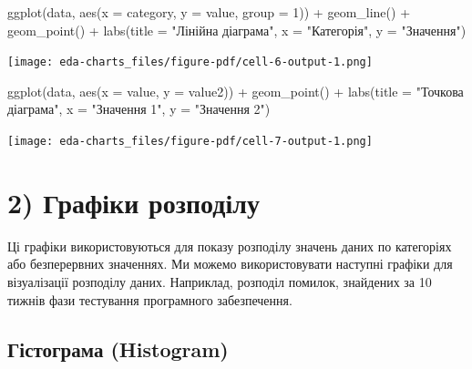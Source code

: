 \documentclass[
  letterpaper,
  DIV=11,
  numbers=noendperiod]{scrreprt}
\newenvironment{Shaded}{\begin{snugshade}}{\end{snugshade}}
\newcommand{\AttributeTok}[1]{\textcolor[rgb]{0.40,0.45,0.13}{#1}}
\newcommand{\DecValTok}[1]{\textcolor[rgb]{0.68,0.00,0.00}{#1}}
\newcommand{\FunctionTok}[1]{\textcolor[rgb]{0.28,0.35,0.67}{#1}}
\newcommand{\NormalTok}[1]{\textcolor[rgb]{0.00,0.23,0.31}{#1}}
\newcommand{\SpecialCharTok}[1]{\textcolor[rgb]{0.37,0.37,0.37}{#1}}
\newcommand{\StringTok}[1]{\textcolor[rgb]{0.13,0.47,0.30}{#1}}
\begin{document}
\begin{Shaded}
\begin{Highlighting}[]
\FunctionTok{ggplot}\NormalTok{(data, }\FunctionTok{aes}\NormalTok{(}\AttributeTok{x =}\NormalTok{ category, }\AttributeTok{y =}\NormalTok{ value, }\AttributeTok{group =} \DecValTok{1}\NormalTok{)) }\SpecialCharTok{+}
  \FunctionTok{geom\_line}\NormalTok{() }\SpecialCharTok{+}
  \FunctionTok{geom\_point}\NormalTok{() }\SpecialCharTok{+}
  \FunctionTok{labs}\NormalTok{(}\AttributeTok{title =} \StringTok{"Лінійна діаграма"}\NormalTok{, }\AttributeTok{x =} \StringTok{"Категорія"}\NormalTok{, }\AttributeTok{y =} \StringTok{"Значення"}\NormalTok{)}
\end{Highlighting}
\end{Shaded}

\texttt{[image: eda-charts\_files/figure-pdf/cell-6-output-1.png]}

\begin{Shaded}
\begin{Highlighting}[]
\FunctionTok{ggplot}\NormalTok{(data, }\FunctionTok{aes}\NormalTok{(}\AttributeTok{x =}\NormalTok{ value, }\AttributeTok{y =}\NormalTok{ value2)) }\SpecialCharTok{+}
  \FunctionTok{geom\_point}\NormalTok{() }\SpecialCharTok{+}
  \FunctionTok{labs}\NormalTok{(}\AttributeTok{title =} \StringTok{"Точкова діаграма"}\NormalTok{, }\AttributeTok{x =} \StringTok{"Значення 1"}\NormalTok{, }\AttributeTok{y =} \StringTok{"Значення 2"}\NormalTok{)}
\end{Highlighting}
\end{Shaded}

\texttt{[image: eda-charts\_files/figure-pdf/cell-7-output-1.png]}

\chapter{2) Графіки
розподілу}\label{ux433ux440ux430ux444ux456ux43aux438-ux440ux43eux437ux43fux43eux434ux456ux43bux443}

Ці графіки використовуються для показу розподілу значень даних по
категоріях або безперервних значеннях. Ми можемо використовувати
наступні графіки для візуалізації розподілу даних. Наприклад, розподіл
помилок, знайдених за 10 тижнів фази тестування програмного
забезпечення.

\section{Гістограма
(Histogram)}\label{ux433ux456ux441ux442ux43eux433ux440ux430ux43cux430-histogram}
\end{document}
